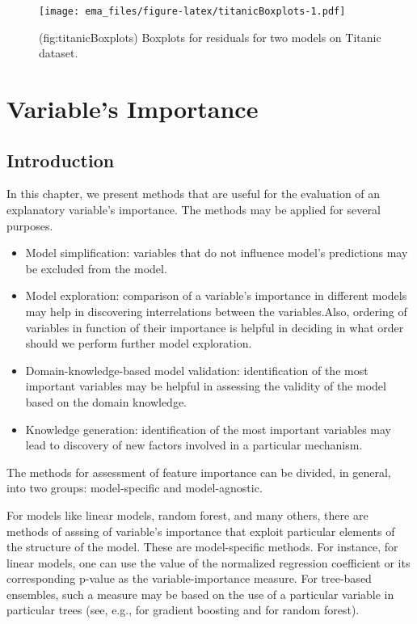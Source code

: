 \documentclass[12pt,]{krantz}
\providecommand{\tightlist}{%
  \setlength{\itemsep}{0pt}\setlength{\parskip}{0pt}}
\begin{document}
\begin{figure}
\centering
\texttt{[image: ema\_files/figure-latex/titanicBoxplots-1.pdf]}
\caption{\label{fig:titanicBoxplots}(fig:titanicBoxplots) Boxplots for residuals for two models on Titanic dataset.}
\end{figure}

\hypertarget{featureImportance}{%
\section{Variable's Importance}\label{featureImportance}}

\hypertarget{featureImportanceIntro}{%
\subsection{Introduction}\label{featureImportanceIntro}}

In this chapter, we present methods that are useful for the evaluation of an explanatory variable's importance. The methods may be applied for several purposes.

\begin{itemize}
\tightlist
\item
  Model simplification: variables that do not influence model's predictions may be excluded from the model.
\item
  Model exploration: comparison of a variable's importance in different models may help in discovering interrelations between the variables.Also, ordering of variables in function of their importance is helpful in deciding in what order should we perform further model exploration.
\item
  Domain-knowledge-based model validation: identification of the most important variables may be helpful in assessing the validity of the model based on the domain knowledge.
\item
  Knowledge generation: identification of the most important variables may lead to discovery of new factors involved in a particular mechanism.
\end{itemize}

The methods for assessment of feature importance can be divided, in general, into two groups: model-specific and model-agnostic.

For models like linear models, random forest, and many others, there are methods of asssing of variable's importance that exploit particular elements of the structure of the model. These are model-specific methods. For instance, for linear models, one can use the value of the normalized regression coefficient or its corresponding p-value as the variable-importance measure. For tree-based ensembles, such a measure may be based on the use of a particular variable in particular trees (see, e.g., \citep{xgboostExplainer} for gradient boosting and \citep{randomForestExplainer} for random forest).
\end{document}
